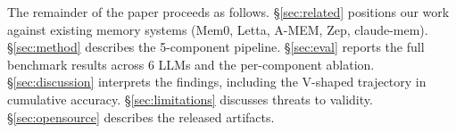 The remainder of the paper proceeds as follows. \S\ref{sec:related}
positions our work against existing memory systems
(Mem0, Letta, A-MEM, Zep, claude-mem). \S\ref{sec:method}
describes the 5-component pipeline. \S\ref{sec:eval} reports the
full benchmark results across 6 LLMs and the per-component ablation.
\S\ref{sec:discussion} interprets the findings, including the V-shaped
trajectory in cumulative accuracy. \S\ref{sec:limitations} discusses
threats to validity. \S\ref{sec:opensource} describes the released
artifacts.
